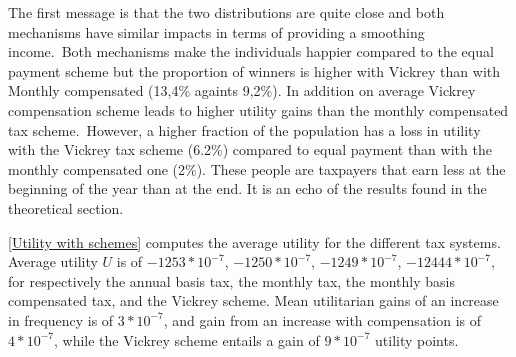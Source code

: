 The first message is that the two distributions are quite close and both
mechanisms have similar impacts in terms of providing a smoothing
income.\ Both mechanisms make the individuals happier compared to the equal
payment scheme but the proportion of winners is higher with Vickrey than with
Monthly compensated (13,4\% againts 9,2\%). In addition on average Vickrey
compensation scheme leads to higher utility gains than the monthly compensated
tax scheme.\ However, a higher fraction of the population has a loss in
utility with the Vickrey tax scheme (6.2\%) compared to equal payment than
with the monthly compensated one (2\%). These people are taxpayers that earn
less at the beginning of the year than at the end. It is an echo of the
results found in the theoretical section.

\autoref{Utility with schemes} computes the average utility for the different tax systems.
Average utility $U$ is of $-1253\ast10^{-7}$, $-1250\ast10^{-7}$,
$-1249\ast10^{-7}$, $-12444\ast10^{-7}$, for respectively the annual basis
tax, the monthly tax, the monthly basis compensated tax, and the Vickrey
scheme. Mean utilitarian gains of an increase in frequency is of $3\ast
10^{-7}$, and gain from an increase with compensation is of $4\ast10^{-7}$,
while the Vickrey scheme entails a gain of $9\ast10^{-7}$ utility points.

\begin{table}[ptb]
\caption{Utility with the different tax schemes}
\label{Utility with schemes}
\centering
{}\end{table}

